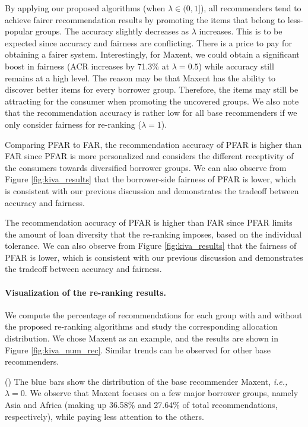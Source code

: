 By applying our proposed algorithms (when $\lambda\in(0,1]$), all recommenders tend to achieve fairer recommendation results by promoting the items that belong to less-popular groups. The accuracy slightly decreases as $\lambda$ increases. This is to be expected since accuracy and fairness are conflicting. There is a price to pay for obtaining a fairer system. Interestingly, for Maxent, we could obtain a significant boost in fairness (ACR increases by 71.3\% at $\lambda=0.5$) while accuracy still remains at a high level. The reason may be that Maxent has the ability to discover better items for every borrower group. Therefore, the items may still be attracting for the consumer when promoting the uncovered groups. We also note that the recommendation accuracy is rather low for all base recommenders if we only consider fairness for re-ranking ($\lambda=1$).

Comparing PFAR to FAR, the recommendation accuracy of PFAR is higher than FAR since PFAR is more personalized and considers the different receptivity of the consumers towards diversified borrower groups. We can also observe from Figure \ref{fig:kiva_results} that the borrower-side fairness of PFAR is lower, which is consistent with our previous discussion and demonstrates the tradeoff between accuracy and fairness.

The recommendation accuracy of PFAR is higher than FAR since PFAR limits the amount of loan diversity that the re-ranking imposes, based on the individual tolerance. We can also observe from Figure \ref{fig:kiva_results} that the fairness of PFAR is lower, which is consistent with our previous discussion and demonstrates the tradeoff between accuracy and fairness.


\paragraph{Visualization of the re-ranking results.} We compute the percentage of recommendations for each group with and without the proposed re-ranking algorithms and study the corresponding allocation distribution. We chose Maxent as an example, and the results are shown in Figure \ref{fig:kiva_num_rec}. Similar trends can be observed for other base recommenders.

() The blue bars show the distribution of the base recommender Maxent, \emph{i.e.,} $\lambda=0$. We observe that Maxent focuses on a few major borrower groups, namely Asia and Africa (making up 36.58\% and 27.64\% of total recommendations, respectively), while paying less attention to the others. 

